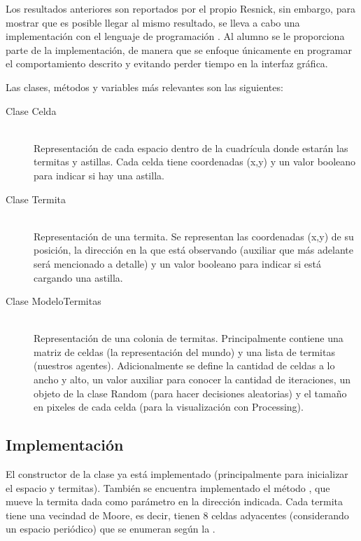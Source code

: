 Los resultados anteriores son reportados por el propio Resnick, sin embargo, para mostrar que es posible llegar al mismo resultado, se lleva a cabo una implementación con el lenguaje de programación .
Al alumno se le proporciona parte de la implementación, de manera que se enfoque únicamente en programar el comportamiento descrito y evitando perder tiempo en la interfaz gráfica.

Las clases, métodos y variables más relevantes son las siguientes:

\begin{description}%
  \item[Clase Celda] \hfill \\
    Representación de cada espacio dentro de la cuadrícula donde estarán las termitas y astillas.
    Cada celda tiene coordenadas (x,y) y un valor booleano para indicar si hay una astilla.

  \item[Clase Termita] \hfill \\
    Representación de una termita. Se representan las coordenadas (x,y) de su posición, la dirección en la que está observando (auxiliar que más adelante será mencionado a detalle) y un valor booleano para indicar si está cargando una astilla.

  \item[Clase ModeloTermitas] \hfill \\
    Representación de una colonia de termitas. Principalmente contiene una matriz de celdas (la representación del mundo) y una lista de termitas (nuestros agentes). Adicionalmente se define la cantidad de celdas a lo ancho y alto, un valor auxiliar para conocer la cantidad de iteraciones, un objeto de la clase Random (para hacer decisiones aleatorias) y el tamaño en pixeles de cada celda (para la visualización con Processing).
\end{description}

\subsection{Implementaci\'on}
El constructor de la clase  ya está implementado (principalmente para inicializar el espacio y termitas). También se encuentra implementado el método , que mueve la termita dada como parámetro en la dirección indicada. Cada termita tiene una vecindad de Moore, es decir, tienen 8 celdas adyacentes (considerando un espacio periódico) que se enumeran según la .

